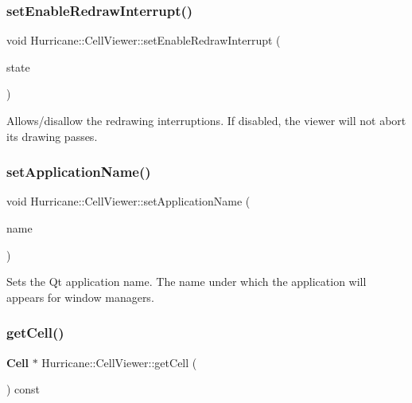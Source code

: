 \subsubsection{\texorpdfstring{set\+Enable\+Redraw\+Interrupt()}{setEnableRedrawInterrupt()}}
{\footnotesize\ttfamily void Hurricane\+::\+Cell\+Viewer\+::set\+Enable\+Redraw\+Interrupt (\begin{DoxyParamCaption}\item[{bool}]{state }\end{DoxyParamCaption})\hspace{0.3cm}{\ttfamily [inline]}}

Allows/disallow the redrawing interruptions. If disabled, the viewer will not abort it\textquotesingle{}s drawing passes. \mbox{\label{classHurricane_1_1CellViewer_a961c789cdae39edad13f171da05f7930}} 
\subsubsection{\texorpdfstring{set\+Application\+Name()}{setApplicationName()}}
{\footnotesize\ttfamily void Hurricane\+::\+Cell\+Viewer\+::set\+Application\+Name (\begin{DoxyParamCaption}\item[{const Q\+String \&}]{name }\end{DoxyParamCaption})\hspace{0.3cm}{\ttfamily [inline]}}

Sets the Qt application name. The name under which the application will appears for window managers. \mbox{\label{classHurricane_1_1CellViewer_af45f807c9d7728a2ecf3184e731e53e0}} 
\subsubsection{\texorpdfstring{get\+Cell()}{getCell()}}
{\footnotesize\ttfamily \textbf{ Cell} $\ast$ Hurricane\+::\+Cell\+Viewer\+::get\+Cell (\begin{DoxyParamCaption}{ }\end{DoxyParamCaption}) const}

